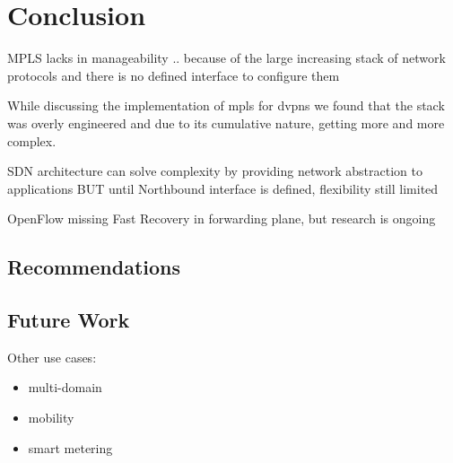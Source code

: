 \section{Conclusion} %
\label{sec:conclusion}


MPLS lacks in manageability .. because of the large increasing stack of network protocols and there is no defined interface to configure them

While discussing the implementation of \ac{mpls} for \acp{dvpn} we found that the stack was overly engineered and due to its cumulative nature, getting more and more complex. 

SDN architecture can solve complexity by providing network abstraction to applications
BUT until Northbound interface is defined, flexibility still limited

OpenFlow missing Fast Recovery in forwarding plane, but research is ongoing




\subsection{Recommendations} %
\label{sub:recommendations}


\subsection{Future Work} %
\label{sub:future_work}


Other use cases:
\begin{itemize}
	\item multi-domain
	\item mobility
	\item smart metering
\end{itemize}

